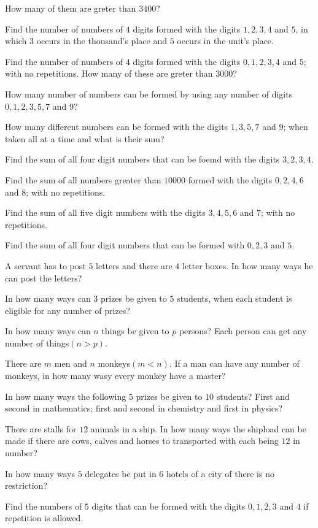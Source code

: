   How many of them are greter than $3400$?
\item Find the number of numbers of $4$ digits formed with the digits $1, 2, 3, 4$ and $5$, in which $3$ occurs in the thousand's
  place and $5$ occurs in the unit's place.
\item Find the number of numbers of $4$ digits formed with the digits $0, 1, 2, 3, 4$ and $5$; with no repetitions. How many of
  these are greter than $3000$?
\item How many number of numbers can be formed by using any number of digits $0, 1, 2, 3, 5, 7$ and $9$?
\item How many different numbers can be formed with the digits $1, 3, 5, 7$ and $9$; when taken all at a time and what is their
  sum?
\item Find the sum of all four digit numbers that can be foemd with the digits $3, 2, 3, 4$.
\item Find the sum of all numbers greater than $10000$ formed with the digits $0, 2, 4, 6$ and $8$; with no repetitions.
\item Find the sum of all five digit numbers with the digits $3, 4, 5, 6$ and $7$; with no repetitions.
\item Find the sum of all four digit numbers that can be formed with $0, 2, 3$ and $5$.
\item A servant has to post $5$ letters and there are $4$ letter boxes. In how many ways he can post the letters?
\item In how many ways can $3$ prizes be given to $5$ students, when each student is eligible for any number of prizes?
\item In how many ways can $n$ things be given to $p$ persons? Each person can get any number of things$(n > p)$.
\item There are $m$ men and $n$ monkeys$(m < n)$. If a man can have any number of monkeys, in how many wasy every monkey have a
  master?
\item In how many ways the following $5$ prizes be given to $10$ students? First and second in mathematics; first and second in
  chemistry and first in physics?
\item There are stalls for $12$ animals in a ship. In how many ways the shipload can be made if there are cows, calves and horses
  to transported with each being $12$ in number?
\item In how many ways $5$ delegates be put in $6$ hotels of a city of there is no restriction?
\item Find the numbers of $5$ digits that can be formed with the digits $0, 1, 2, 3$ and $4$ if repetition is allowed.
